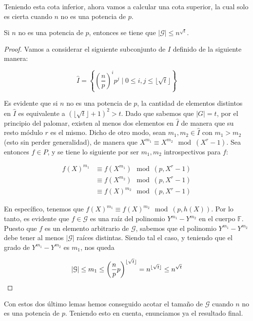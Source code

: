 Teniendo esta cota inferior, ahora vamos a calcular una cota superior, la cual solo es cierta cuando $n$ no es una potencia de $p$.

\begin{lema}\label{cota_superior_G}
	Si $n$ no es una potencia de $p$, entonces se tiene que $|\mathcal{G}| \leq n^{\sqrt{t}}$.
\end{lema}

\begin{proof}
	Vamos a considerar el siguiente subconjunto de $I$ definido de la siguiente manera:
	
	\begin{equation}\label{subconjunto_de_I}
	\hat{I} = \left\{\left(\frac{n}{p}\right)^ip^j \mid 0 \leq i,j \leq \lfloor \sqrt{t} \rfloor \right\}
	\end{equation}
	
	Es evidente que si $n$ no es una potencia de $p$, la cantidad de elementos distintos en $\hat{I}$ es equivalente a $(\lfloor \sqrt{t} \rfloor + 1)^2 > t$. Dado que sabemos que $|G| = t$, por el principio del palomar, existen al menos dos elementos en $\hat{I}$ de manera que su resto módulo $r$ es el mismo. Dicho de otro modo, sean $m_1, m_2 \in \hat{I}$ con $m_1 > m_2$ (esto sin perder generalidad), de manera que $X^{m_1} \equiv X^{m_2} \mod(X^r - 1)$. Sea entonces $f \in P$, y se tiene lo siguiente por ser $m_1, m_2$ introspectivos para $f$:
	
	\begin{align}
	f(X)^{m_1} &\equiv f(X^{m_1}) \mod(p, X^r-1)\\
	&\equiv f(X^{m_2}) \mod(p, X^r-1)\\
	&\equiv f(X)^{m_2} \mod(p, X^r-1)
	\end{align}
	
	En específico, tenemos que $f(X)^{m_1} \equiv f(X)^{m_2} \mod(p, h(X))$. Por lo tanto, es evidente que $f \in \mathcal{G}$ es una raíz del polinomio $Y^{m_1} - Y^{m_2}$ en el cuerpo $\mathbb{F}$. Puesto que $f$ es un elemento arbitrario de $\mathcal{G}$, sabemos que el polinomio $Y^{m_1} - Y^{m_2}$ debe tener al menos $|\mathcal{G}|$ raíces distintas. Siendo tal el caso, y teniendo que el grado de $Y^{m_1} - Y^{m_2}$ es $m_1$, nos queda
	
	\[|\mathcal{G}| \leq m_1 \leq \left(\frac{n}{p}p\right)^{\lfloor\sqrt{t}\rfloor} = n^{\lfloor\sqrt{t}\rfloor} \leq n^{\sqrt{t}}\qedhere \]
\end{proof}

Con estos dos último lemas hemos conseguido acotar el tamaño de $\mathcal{G}$ cuando $n$ no es una potencia de $p$. Teniendo esto en cuenta, enunciamos ya el resultado final.

